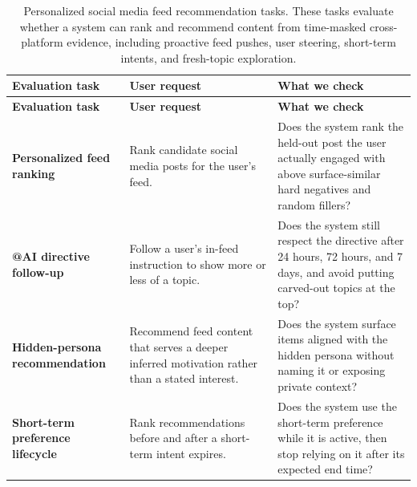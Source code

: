 \documentclass[]{fairmeta}
\begin{document}
{\footnotesize
\setlength{\tabcolsep}{4pt}
\begin{longtable}{p{}p{}p{}}
\caption{Personalized social media feed recommendation tasks. These tasks evaluate whether a system can rank and recommend content from time-masked cross-platform evidence, including proactive feed pushes, user steering, short-term intents, and fresh-topic exploration.}
\label{tab:feed_recommendation_tasks} \\
\toprule
\textbf{Evaluation task} & \textbf{User request} & \textbf{What we check} \\
\midrule
\endfirsthead

\toprule
\textbf{Evaluation task} & \textbf{User request} & \textbf{What we check} \\
\midrule
\endhead

\bottomrule
\endlastfoot

\textbf{Personalized feed ranking}
& Rank candidate social media posts for the user's feed.
& Does the system rank the held-out post the user actually engaged with above surface-similar hard negatives and random fillers? \\
\midrule
\textbf{@AI directive follow-up}
& Follow a user's in-feed instruction to show more or less of a topic.
& Does the system still respect the directive after 24 hours, 72 hours, and 7 days, and avoid putting carved-out topics at the top? \\
\midrule
\textbf{Hidden-persona recommendation}
& Recommend feed content that serves a deeper inferred motivation rather than a stated interest.
& Does the system surface items aligned with the hidden persona without naming it or exposing private context? \\
\midrule
\textbf{Short-term preference lifecycle}
& Rank recommendations before and after a short-term intent expires.
& Does the system use the short-term preference while it is active, then stop relying on it after its expected end time? \\
\end{longtable}
}
\end{document}
